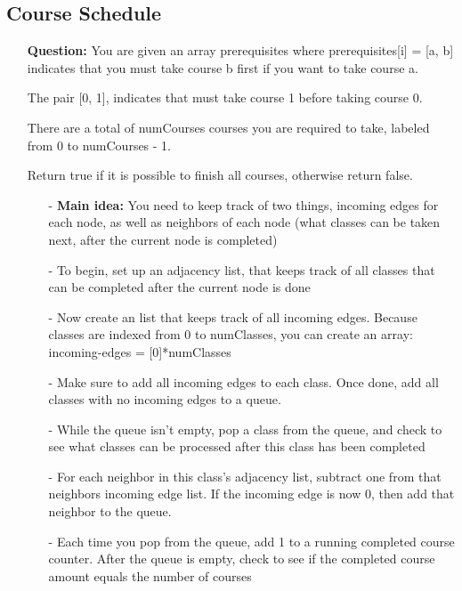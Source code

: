 \documentclass[12pt]{article}
\begin{document}
\subsection{Course Schedule}
\begin{enumerate}
  \item[] \textbf{Question:} You are given an array prerequisites where prerequisites[i] = [a, b] indicates that you must take course b first if you want to take course a.

The pair [0, 1], indicates that must take course 1 before taking course 0.

There are a total of numCourses courses you are required to take, labeled from 0 to numCourses - 1.

Return true if it is possible to finish all courses, otherwise return false.

    \begin{enumerate}
      \item[-] \textbf{Main idea:} You need to keep track of two things, incoming edges for each node, as well as neighbors of each node (what classes can be taken next, after the current node is completed)
      \item[-] To begin, set up an adjacency list, that keeps track of all classes that can be completed after the current node is done
      \item[-] Now create an list that keeps track of all incoming edges. Because classes are indexed from 0 to numClasses, you can create an array: incoming-edges = [0]*numClasses
      \item[-] Make sure to add all incoming edges to each class. Once done, add all classes with no incoming edges to a queue.
      \item[-] While the queue isn't empty, pop a class from the queue, and check to see what classes can be processed after this class has been completed 
      \item[-] For each neighbor in this class's adjacency list, subtract one from that neighbors incoming edge list. If the incoming edge is now 0, then add that neighbor to the queue. 
      \item[-] Each time you pop from the queue, add 1 to a running completed course counter. After the queue is empty, check to see if the completed course amount equals the number of courses
    \end{enumerate}
\end{enumerate}
\end{document}
